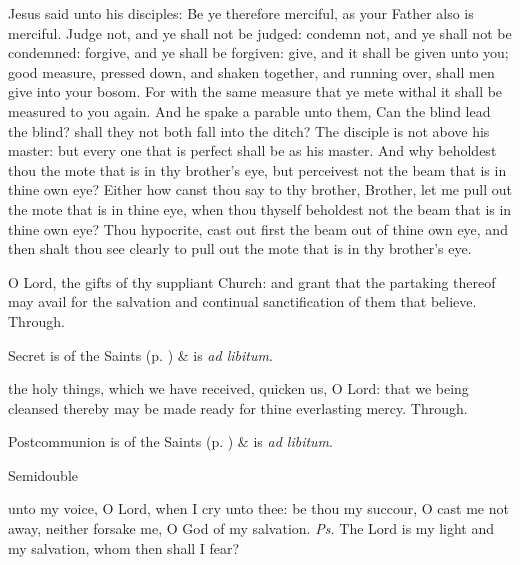  Jesus said unto his disciples: Be ye therefore merciful, as your Father also is merciful. Judge not, and ye shall not be judged: condemn not, and ye shall not be condemned: forgive, and ye shall be forgiven: give, and it shall be given unto you; good measure, pressed down, and shaken together, and running over, shall men give into your bosom. For with the same measure that ye mete withal it shall be measured to you again. And he spake a parable unto them, Can the blind lead the blind? shall they not both fall into the ditch? The disciple is not above his master: but every one that is perfect shall be as his master. And why beholdest thou the mote that is in thy brother's eye, but perceivest not the beam that is in thine own eye? Either how canst thou say to thy brother, Brother, let me pull out the mote that is in thine eye, when thou thyself beholdest not the beam that is in thine own eye? Thou hypocrite, cast out first the beam out of thine own eye, and then shalt thou see clearly to pull out the mote that is in thy brother's eye.


\secret
{} O Lord, the gifts of thy suppliant Church: and grant that the partaking thereof may avail for the salvation and continual sanctification of them that believe. Through.
\begin{rubric}
     Secret is of the Saints (p. \pageref{SPSaints}) \&  is \emph{ad libitum}.
\end{rubric}



\postcommunion
{} the holy things, which we have received, quicken us, O Lord: that we being cleansed thereby may be made ready for thine everlasting mercy. Through.
\begin{rubric}
     Postcommunion is of the Saints (p. \pageref{SPSaints}) \&  is \emph{ad libitum}.
\end{rubric}

\begin{inhead}
    {Semidouble}
\end{inhead}

\properantiphonfix

\introit
{} unto my voice, O Lord, when I cry unto thee: be thou my succour, O cast me not away, neither forsake me, O God of my salvation. \textit{Ps.} The Lord is my light and my salvation, whom then shall I fear?

